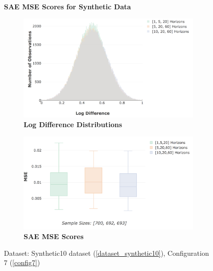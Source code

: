 \documentclass[a4paper,11pt,oneside]{article}
\theoremstyle{plain}
\theoremstyle{definition}
\begin{document}
	\begin{figure}[H]
		\centering
		\textbf{SAE MSE Scores for Synthetic Data}
		\begin{subfigure}{.99\textwidth}
			\centering 
			\includegraphics[scale=0.4]{images/results/8_5_synthetic_data/test_aggregate_dist.png}
			\caption{\textbf{Log Difference Distributions} 
				\newline }
			\label{figure-test_aggregate_dist}
		\end{subfigure}
		\begin{subfigure}{.99\textwidth}
			\centering 
			\includegraphics[scale=0.4]{images/results/8_5_synthetic_data/test_aggregation_mse.png}
			\caption{\textbf{SAE MSE Scores} 
				\newline }
			\label{figure-test_aggregation_mse}
		\end{subfigure}
		\caption[SAE MSE Scores for Synthetic Data]
		{Dataset: Synthetic10 dataset (\ref{dataset_synthetic10}), Configuration 7 (\ref{config7})
}
\end{figure}
\end{document}
